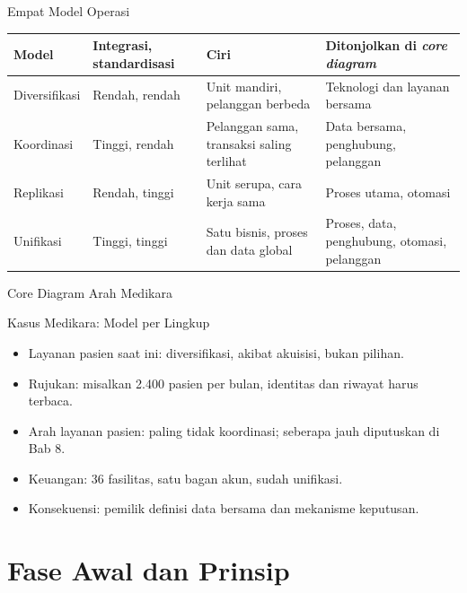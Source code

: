 \documentclass[aspectratio=169, table, 12pt]{beamer}
\begin{document}
\begin{frame}{{\Large Empat Model Operasi}}
  \footnotesize
  \begin{tabularx}{\textwidth}{>{\raggedright\arraybackslash}p{1.9cm}
      >{\raggedright\arraybackslash}p{1.6cm} >{\raggedright\arraybackslash}X
      >{\raggedright\arraybackslash}X}
    \hline
    \textbf{Model} & \textbf{Integrasi, standardisasi} & \textbf{Ciri} & \textbf{Ditonjolkan di \textit{core diagram}} \\
    \hline
    Diversifikasi & Rendah, rendah & Unit mandiri, pelanggan berbeda & Teknologi dan layanan bersama \\
    \hline
    Koordinasi & Tinggi, rendah & Pelanggan sama, transaksi saling terlihat & Data bersama, penghubung, pelanggan \\
    \hline
    Replikasi & Rendah, tinggi & Unit serupa, cara kerja sama & Proses utama, otomasi \\
    \hline
    Unifikasi & Tinggi, tinggi & Satu bisnis, proses dan data global & Proses, data, penghubung, otomasi, pelanggan \\
    \hline
  \end{tabularx}
\end{frame}

\begin{frame}{{\Large Core Diagram Arah Medikara}}
  \centering
\end{frame}

\begin{frame}{{\Large Kasus Medikara: Model per Lingkup}}
  \vspace{10pt}
  \begin{itemize}
    \item Layanan pasien saat ini: diversifikasi, akibat akuisisi, bukan pilihan.
    \item Rujukan: misalkan 2.400 pasien per bulan, identitas dan riwayat harus terbaca.
    \item Arah layanan pasien: paling tidak koordinasi; seberapa jauh diputuskan di Bab 8.
    \item Keuangan: 36 fasilitas, satu bagan akun, sudah unifikasi.
    \item Konsekuensi: pemilik definisi data bersama dan mekanisme keputusan.
  \end{itemize}
\end{frame}

\section{Fase Awal dan Prinsip}
\end{document}
